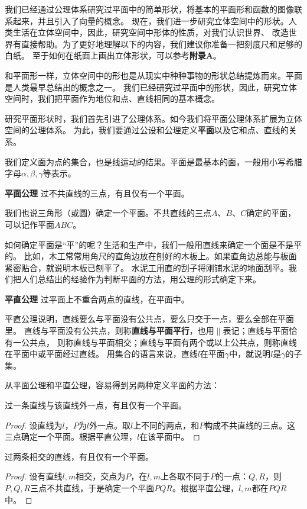 \documentclass[12pt,UTF8]{ctexbook}
\begin{document}
我们已经通过公理体系研究过平面中的简单形状，将基本的平面形和函数的图像联系起来，并且引入了向量的概念。
现在，我们进一步研究立体空间中的形状。人类生活在立体空间中，因此，研究空间中形体的性质，对我们认识世界、
改造世界有直接帮助。为了更好地理解以下的内容，我们建议你准备一把刻度尺和足够的白纸。
至于如何在纸面上画出立体形状，可以参考\textbf{附录A}。


和平面形一样，立体空间中的形也是从现实中种种事物的形状总结提炼而来。平面是人类最早总结出的概念之一。
我们已经研究过平面中的形状，因此，研究立体空间时，我们把平面作为地位和点、直线相同的基本概念。

研究平面形状时，我们首先引进了公理体系。如今我们将平面公理体系扩展为立体空间的公理体系。
为此，我们要通过公设和公理定义\textbf{平面}以及它和点、直线的关系。

我们定义面为点的集合，也是线运动的结果。平面是最基本的面，一般用小写希腊字母$\alpha,\beta,\gamma$等表示。
\begin{po}{\textbf{平面公理}}\label{po:0}
    过不共直线的三点，有且仅有一个平面。
\end{po}

我们也说三角形（或圆）确定一个平面。不共直线的三点$A$、$B$、$C$确定的平面，可以记作平面$ABC$。

如何确定平面是“平”的呢？生活和生产中，我们一般用直线来确定一个面是不是平的。
比如，木工常常用角尺的直角边放在刨好的木板上。如果直角边总能与板面紧密贴合，就说明木板已刨平了。
水泥工用直的刮子将刚铺水泥的地面刮平。我们把人们总结出的经验作为判断平面的方法，用公理的形式确定下来。
\begin{po}{\textbf{平直公理}}\label{po:1}
    过平面上不重合两点的直线，在平面中。
\end{po}
平直公理说明，直线要么与平面没有公共点，要么只交于一点，要么全部在平面里。
直线与平面没有公共点，则称\textbf{直线与平面平行}，也用$\parallel$表记；直线与平面恰有一公共点，
则称直线与平面相交；直线与平面有两个或以上公共点，则称直线在平面中或平面经过直线。
用集合的语言来说，直线$l$在平面$\gamma$中，就说明$l$是$\gamma$的子集。

从平面公理和平直公理，容易得到另两种定义平面的方法：
\begin{tm}\label{tm:1-0-0}
    过一条直线与该直线外一点，有且仅有一个平面。
\end{tm}
\begin{proof}
    设直线为$l$，$P$为$l$外一点。取$l$上不同的两点，和$P$构成不共直线的三点。这三点确定一个平面。根据平直公理，$l$在该平面中。
\end{proof}
\begin{tm}\label{tm:1-0-1}
    过两条相交的直线，有且仅有一个平面。
\end{tm}
\begin{proof}
    设有直线$l,m$相交，交点为$P$，在$l,m$上各取不同于$P$的一点：$Q,R$，则$P,Q,R$三点不共直线，于是确定一个平面$PQR$。根据平直公理，$l,m$都在$PQR$中。
\end{proof}
\end{document}
